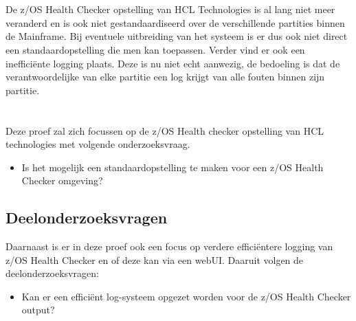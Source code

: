 \section{}
\label{sec:probleemstelling}

De z/OS Health Checker opstelling van HCL Technologies is al lang niet meer veranderd en is ook niet gestandaardiseerd over de verschillende partities binnen de Mainframe. Bij eventuele uitbreiding van het systeem is er dus ook niet direct een standaardopstelling die men kan toepassen. Verder vind er ook een inefficiënte logging plaats. Deze is nu niet echt aanwezig, de bedoeling is dat de verantwoordelijke van elke partitie een log krijgt van alle fouten binnen zijn partitie.

\section{}
\label{sec:Hoofdonderzoeksvraag}

Deze proef zal zich focussen op de z/OS Health checker opstelling van HCL technologies met volgende onderzoeksvraag.

\begin{itemize}
	\item Is het mogelijk een standaardopstelling te maken voor een z/OS Health Checker omgeving?
\end{itemize}

\subsection{Deelonderzoeksvragen}
\label{subsec:Deelonderzoeksvragen}

Daarnaast is er in deze proef ook een focus op verdere efficiëntere logging van z/OS Health Checker en of deze kan via een webUI. Daaruit volgen de deelonderzoeksvragen:

\begin{itemize}
	\item Kan er een efficiënt log-systeem opgezet worden voor de z/OS Health Checker output?
\end{itemize}


\section{}
\label{sec:onderzoeksdoelstelling}

